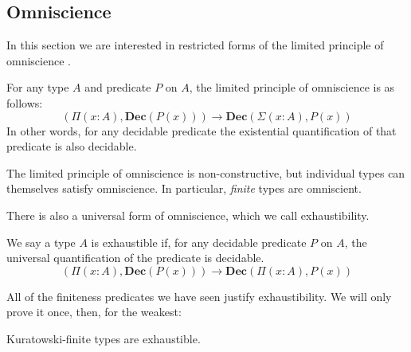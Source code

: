 \subsection{Omniscience}
In this section we are interested in restricted forms of the limited principle
of omniscience \cite{myhillErrettBishopFoundations1972}.
\begin{romdefinition}
  For any type \(A\) and predicate \(P\) on \(A\), the limited principle of
  omniscience is as follows:
  \begin{equation}
    \left( \Pi {(x : A)} , \mathbf{Dec}(P(x)) \right) \rightarrow \mathbf{Dec} \left( \Sigma {(x : A)} , P(x) \right)
  \end{equation}
  In other words, for any decidable predicate the existential quantification of
  that predicate is also decidable.
\end{romdefinition}
The limited principle of omniscience is non-constructive, but individual types
can themselves satisfy omniscience.
In particular, \emph{finite} types are omniscient.

There is also a universal form of omniscience, which we call exhaustibility.
\begin{romdefinition}[Exhaustibility]
  We say a type \(A\) is exhaustible if, for any decidable predicate \(P\) on
  \(A\), the universal quantification of the predicate is decidable.
  \begin{equation}
    \left( \Pi {(x : A)} , \mathbf{Dec}(P(x)) \right) \rightarrow \mathbf{Dec} \left( \Pi {(x : A)} , P(x) \right)
  \end{equation}
\end{romdefinition}

All of the finiteness predicates we have seen justify exhaustibility.
We will only prove it once, then, for the weakest:
\begin{romtheorem}
  Kuratowski-finite types are exhaustible.
\end{romtheorem}

